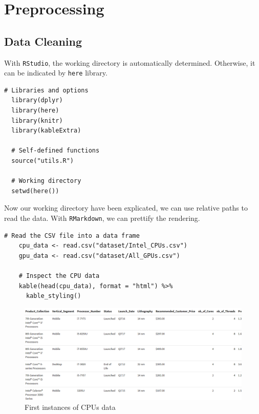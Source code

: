 \chapter{Preprocessing}

\section{Data Cleaning}

With \texttt{RStudio}, the working directory is automatically determined. Otherwise, it can be indicated by \texttt{here} library.

\begin{lstlisting}[caption={Required libraries and working directory setup}]
  # Libraries and options
  library(dplyr)
  library(here)
  library(knitr)
  library(kableExtra)
  
  # Self-defined functions
  source("utils.R")
  
  # Working directory
  setwd(here())
  \end{lstlisting}

Now our working directory have been explicated, we can use relative paths to read the data. With \texttt{RMarkdown}, we can prettify the rendering.

\begin{lstlisting}[caption={RStudio data object initialization}]
    # Read the CSV file into a data frame
    cpu_data <- read.csv("dataset/Intel_CPUs.csv")
    gpu_data <- read.csv("dataset/All_GPUs.csv")
    
    # Inspect the CPU data
    kable(head(cpu_data), format = "html") %>%
      kable_styling()
    \end{lstlisting}

\begin{figure}[!ht]
  \centering
  \includegraphics[width=\textwidth]{img/cpu-head.png}
  \vspace{0.5cm}
  \caption{First instances of CPUs data}
\end{figure}

